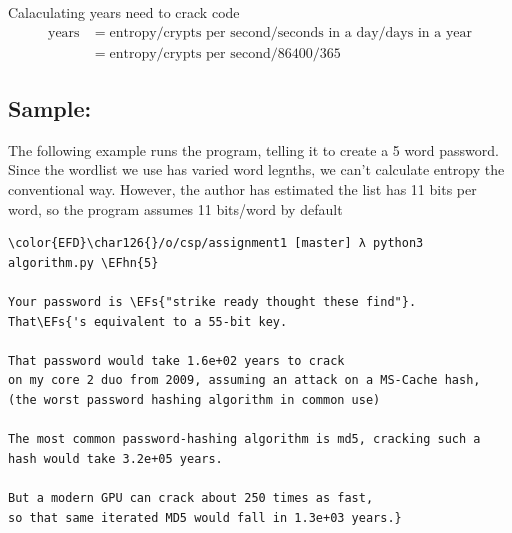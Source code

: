 \documentclass{scrartcl}
\newcommand{\EFs}[1]{\textcolor{EFs}{#1}} %
\newcommand{\EFhn}[1]{\textcolor{EFhn}{\textbf{#1}}} %
\begin{document}
Calaculating years need to crack code
\begin{align*}
\text{years}&=\text{entropy}/\text{crypts per second}/\text{seconds in a day}/\text{days in a year}\\
&=\text{entropy}/\text{crypts per second}/86400/365
\end{align*}

\subsection{Sample:}
\label{sec:org6dc1fff}
The following example runs the program, telling it to create a 5 word password.
Since the wordlist we use has varied word legnths, we can't calculate entropy
the conventional way. However, the author has estimated the list has 11 bits per
word, so the program assumes 11 bits/word by default
\begin{Code}
\begin{Verbatim}[]
\color{EFD}\char126{}/o/csp/assignment1 [master] λ python3 algorithm.py \EFhn{5}

Your password is \EFs{"strike ready thought these find"}.
That\EFs{'s equivalent to a 55-bit key.

That password would take 1.6e+02 years to crack
on my core 2 duo from 2009, assuming an attack on a MS-Cache hash,
(the worst password hashing algorithm in common use)

The most common password-hashing algorithm is md5, cracking such a hash would take 3.2e+05 years.

But a modern GPU can crack about 250 times as fast,
so that same iterated MD5 would fall in 1.3e+03 years.}
\end{Verbatim}
\end{Code}
\end{document}

